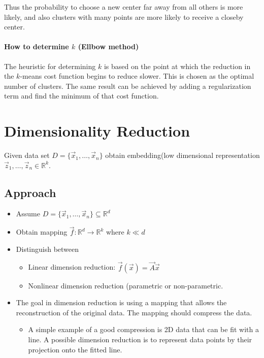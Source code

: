 \documentclass[8pt,a4paper]{scrartcl}
\begin{document}
\begin{multicols*}{3}
\begin{enumerate}

Thus the probability to choose a new center far away from all others is more likely, and also clusters with many points are more likely to receive a closeby center.
\end{enumerate}

\paragraph{How to determine $k$ (Ellbow method)}

The heuristic for determining $k$ is based on the point at which the reduction in the $k$-means cost function begins to reduce slower. This is chosen as the optimal number of clusters. The same result can be achieved by adding a regularization term and find the minimum of that cost function.

\section{Dimensionality Reduction}

Given data set $D=\{\vec{x}_1,\ldots,\vec{x}_n\}$ obtain \glqq embedding\grqq (low dimensional representation $\vec{z}_1,\ldots,\vec{z}_n\in\mathbb{R}^k$.

\subsection{Approach}

\begin{itemize}
\ncompaq
\item Assume $D=\{\vec{x}_1,\dots,\vec{x}_n\}\subseteq\mathbb{R}^d$
\item Obtain mapping $\vec{f}:\mathbb{R}^d\rightarrow\mathbb{R}^k$ where $k\ll d$
\item Distinguish between
\begin{itemize}
\ncompaq
\item Linear dimension reduction: $\vec{f}(\vec{x})=\vec{A}\vec{x}$
\item Nonlinear dimension reduction (parametric or non-parametric.
\end{itemize}
\item The goal in dimension reduction is using a mapping that allows the reconstruction of the original data. The mapping should compress the data.
\begin{itemize}
\ncompaq
\item A simple example of a good compression is 2D data that can be fit with a line. A possible dimension reduction is to represent data points by their projection onto the fitted line.
\end{itemize}
\end{itemize}


\end{multicols*}
\end{document}
